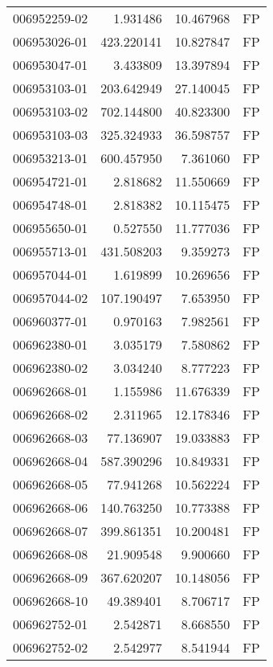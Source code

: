 \begin{tabular}{lrrl}
006952259-02 &    1.931486 &      10.467968 &   FP \\
006953026-01 &  423.220141 &      10.827847 &   FP \\
006953047-01 &    3.433809 &      13.397894 &   FP \\
006953103-01 &  203.642949 &      27.140045 &   FP \\
006953103-02 &  702.144800 &      40.823300 &   FP \\
006953103-03 &  325.324933 &      36.598757 &   FP \\
006953213-01 &  600.457950 &       7.361060 &   FP \\
006954721-01 &    2.818682 &      11.550669 &   FP \\
006954748-01 &    2.818382 &      10.115475 &   FP \\
006955650-01 &    0.527550 &      11.777036 &   FP \\
006955713-01 &  431.508203 &       9.359273 &   FP \\
006957044-01 &    1.619899 &      10.269656 &   FP \\
006957044-02 &  107.190497 &       7.653950 &   FP \\
006960377-01 &    0.970163 &       7.982561 &   FP \\
006962380-01 &    3.035179 &       7.580862 &   FP \\
006962380-02 &    3.034240 &       8.777223 &   FP \\
006962668-01 &    1.155986 &      11.676339 &   FP \\
006962668-02 &    2.311965 &      12.178346 &   FP \\
006962668-03 &   77.136907 &      19.033883 &   FP \\
006962668-04 &  587.390296 &      10.849331 &   FP \\
006962668-05 &   77.941268 &      10.562224 &   FP \\
006962668-06 &  140.763250 &      10.773388 &   FP \\
006962668-07 &  399.861351 &      10.200481 &   FP \\
006962668-08 &   21.909548 &       9.900660 &   FP \\
006962668-09 &  367.620207 &      10.148056 &   FP \\
006962668-10 &   49.389401 &       8.706717 &   FP \\
006962752-01 &    2.542871 &       8.668550 &   FP \\
006962752-02 &    2.542977 &       8.541944 &   FP \\

\end{tabular}
